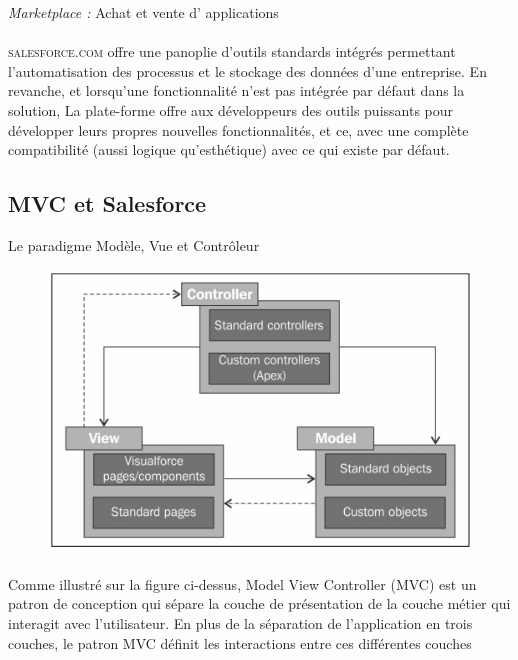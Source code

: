 \documentclass[a4paper, 12pt]{report}
\begin{document}
\begin{itemize}
\begin{description}
\item{\textit{Marketplace : }} Achat et vente d' applications

\end{description}

\paragraph{}
\textsc{salesforce.com} offre une panoplie d'outils standards intégrés permettant l'automatisation des processus et le stockage des données d'une entreprise. En revanche, et lorsqu'une fonctionnalité n'est pas intégrée par défaut dans la solution, La plate-forme offre aux développeurs des outils puissants pour développer leurs propres nouvelles fonctionnalités, et ce, avec une complète compatibilité (aussi logique qu'esthétique) avec ce qui existe par défaut. 
\subsection {MVC et Salesforce}
Le paradigme Modèle, Vue et Contrôleur
\begin{figure}[H]
	\centering
		\includegraphics{mvc.png}
	\label{fig:MVC en Salesforce}
\end{figure}
\paragraph{}
Comme illustré sur la figure ci-dessus, Model View Controller (MVC) est un
patron de conception qui sépare la couche de présentation de la couche métier qui
interagit avec l'utilisateur. En plus de la séparation de l'application en trois couches,
le patron MVC définit les interactions entre ces différentes couches

\end{itemize}
\end{document}
